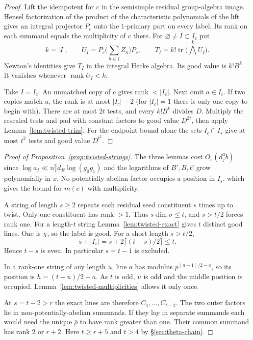 \begin{proof}
Lift the idempotent for $c$ in the semisimple residual group-algebra
image. Hensel factorization of the product of the characteristic
polynomials of the lift gives an integral projector $P_c$ onto the
$1$-primary part on every label. Its rank on each summand equals
the multiplicity of $c$ there. For $\varnothing\ne I\subset I_c$ put
\[
 k=|I|,\qquad U_I=P_c\Big(\sum_{h\in I}Z_h\Big)P_c,\qquad
 T_I=k!\operatorname{tr}\bigl(\textstyle\bigwedge^k U_I\bigr).
\]
Newton's identities give $T_I$ in the integral Hecke algebra. Its
good value is $k!B^k$. It vanishes whenever $\operatorname{rank}U_I<k$.

Take $I=I_c$. An unmatched copy of $c$ gives rank $<|I_c|$.
Next omit $a\in I_c$. If two copies match $a$, the rank is at most
$|I_c|-2$ (for $|I_c|=1$ there is only one copy to begin with).
There are at most $2t$ tests, and every $k!B^k$ divides $D$.
Multiply the rescaled tests and pad with constant factors to good
value $D^{2t}$, then apply Lemma~\ref{lem:twisted-trim}.
For the endpoint bound alone the sets $I_c\cap I_s$ give at most
$t^2$ tests and good value $D^{t^2}$.
\end{proof}

\begin{proof}[Proof of Proposition~\ref{prop:twisted-strings}]
The three lemmas cost $O_\varepsilon(d_j^0b)$ since
$\log a_I\ll n_V^3d_E\log(g_0g_1)$ and the logarithms of $B',B,t!$
grow polynomially in $x$. No potentially abelian factor occupies a
position in $I_s$, which gives the bound for $m(c)$ with multiplicity.

A string of length $s\ge2$ repeats each residual seed constituent
$s$ times up to twist. Only one constituent has rank $>1$. Thus
$s\dim\sigma\le t$, and $s>t/2$ forces rank one. For a length-$t$
string Lemma~\ref{lem:twisted-exact} gives $t$ distinct good lines.
One is $\chi$, so the label is good. For a short length $s>t/2$,
\[
 s+|I_s|=s+2\lceil(t-s)/2\rceil\le t .
\]
Hence $t-s$ is even. In particular $s=t-1$ is excluded.

In a rank-one string of any length $u$, line $a$ has modulus
$p^{(u-1)/2-a}$, so its position is $h=(t-u)/2+a$.
As $t$ is odd, $u$ is odd and the middle position is occupied.
Lemma~\ref{lem:twisted-multiplicities} allows it only once.

At $s=t-2>r$ the exact lines are therefore $C_1,\ldots,C_{t-2}$.
The two outer factors lie in non-potentially-abelian summands.
If they lay in separate summands each would need the unique
$\bar\rho$ to have rank greater than one. Their common summand has
rank $2$ or $r+2$. Here $t\ge r+5$ and $t>4$ by \S\ref{sec:theta-chain}.
\end{proof}

